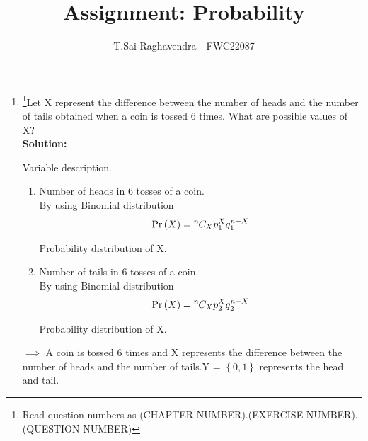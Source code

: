 \documentclass{article}
\providecommand{\pr}[1]{\ensuremath{\Pr\left(#1\right)}}
\providecommand{\brak}[1]{\ensuremath{\left\{#1\right\}}}
\newcommand*{\permcomb}[4][0mu]{{{}^{#3}\mkern#1#2_{#4}}}
\newcommand*{\comb}[1][-1mu]{\permcomb[#1]{C}}
\newcommand{\solution}{\noindent \textbf{Solution: }}
\begin{document}
\title{Assignment: Probability}
\author{\Large T.Sai Raghavendra - FWC22087}
\date{}


\maketitle
\begin{enumerate}[label=13.\arabic{enumi}.\arabic{enumii}]%
\setcounter{enumi}{3}
\setcounter{enumii}{3}

\item \footnote{Read question numbers as (CHAPTER NUMBER).(EXERCISE NUMBER).(QUESTION NUMBER)}Let X represent the difference between the number of heads and the number of tails obtained when a coin is tossed 6 times. What are possible values of X?\\

\solution

	\begin{table}[h]
	\centering
	
	\caption{Variable description.}
	\label{tables:table1}
	\end{table}
	
\begin{enumerate}
\item Number of heads in 6 tosses of a coin.\\
By using Binomial distribution
\begin{align}
\pr{X} = \comb{n}{X}p_1^{X}q_1^{n-X}
\end{align}
	\begin{table}[h]
	\centering
	
	\caption{Probability distribution of X.}
	\label{tables:table2}
	\end{table}
\item Number of tails in 6 tosses of a coin.\\
By using Binomial distribution
\begin{align}
\pr{X} = \comb{n}{X}p_2^{X}q_2^{n-X}
\end{align}
	\begin{table}[h]
	\centering
	
	\caption{Probability distribution of X.}
	\label{tables:table3}
	\end{table}
\end{enumerate}


$\implies$ A coin is tossed 6 times and X represents the difference between the number of heads and the number of tails.Y = $\brak{0,1}$ represents the head and tail.\\


\end{enumerate}
\end{document}
